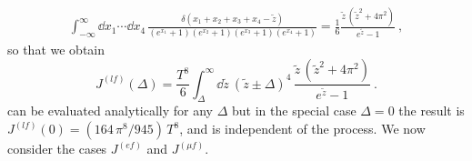 \begin{equation*}
\begin{aligned}
    \int_{-\infty}^{\infty} \! \dd x_1 \cdots \dd x_4 \, 
    \frac{
        \delta(x_1 + x_2 + x_3 + x_4 - \tilde{z})
    }{
        (e^{x_1} + 1)
        (e^{x_2} + 1)
        (e^{x_3} + 1)
        (e^{x_4} + 1)
    }
    = 
    \frac{1}{6} \frac{\tilde{z} \, (\tilde{z}^2 + 4\pi^2)}{e^{\tilde{z}} - 1}~,
\end{aligned}
\end{equation*}
so that we obtain
\begin{equation}
    \label{eq:J-only-z-integral}
    J^{(lf)}(\Delta) = 
    \frac{T^8}{6}
    \int_\Delta^\infty \! \dd \tilde{z} \  (\tilde{z} \pm \Delta)^4 \, 
    \frac{\tilde{z} \, (\tilde{z}^2 + 4\pi^2)}
    {e^{\tilde{z}} - 1}~.
\end{equation}
 can be evaluated analytically for any $\Delta$ but in the special case $\Delta = 0$ the result is $J^{(lf)} (0) = (164 \, \pi^8 / 945) \, T^8$, and is independent of the process.
We now consider the cases $J^{(ef)}$ and $J^{(\mu f)}$.

